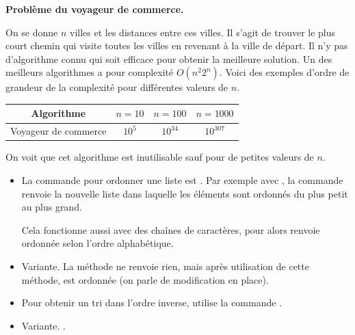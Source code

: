 \documentclass[11pt,class=report,crop=false]{standalone}
\begin{document}
\begin{cours}
\bigskip

\textbf{Problème du voyageur de commerce.}

On se donne $n$ villes et les distances entre ces villes. Il s'agit de trouver le plus court chemin qui visite toutes les villes en revenant à la ville de départ. Il n'y pas d'algorithme connu qui soit efficace pour obtenir la meilleure solution. Un des meilleurs algorithmes a pour complexité $O(n^2  2^n)$.
Voici des exemples d'ordre de grandeur de la complexité pour différentes valeurs de $n$.
\begin{center}
	\begin{tabular}{|c|c|c|c|}\hline
		Algorithme  & $n=10$ & $n=100$ & $n=1000$  \\ \hline\hline
		Voyageur de commerce & $10^5$ & $10^{34}$ & $10^{307}$ \\ \hline

	\end{tabular}
\end{center} 

On voit que cet algorithme est inutilisable sauf pour de petites valeurs de $n$.

 	
\end{cours}



\begin{cours}
\sauteligne
\begin{itemize}
	
	\item  La commande \Python{} pour ordonner une liste est .
	Par exemple avec , la commande  renvoie la nouvelle liste \ci{[1, 5, 6, 8, 10]} dans laquelle les éléments sont ordonnés du plus petit au plus grand.
	
	Cela fonctionne aussi avec des chaînes de caractères, pour	
	 alors  renvoie  ordonnée selon l'ordre alphabétique.
	
	\item Variante. La méthode  ne renvoie rien, mais après utilisation de cette méthode,  est ordonnée (on parle de modification en place).
	
	\item Pour obtenir un tri dans l'ordre inverse, utilise la commande .
	
	\item  Variante. .
\end{itemize}
\end{cours}
\end{document}
